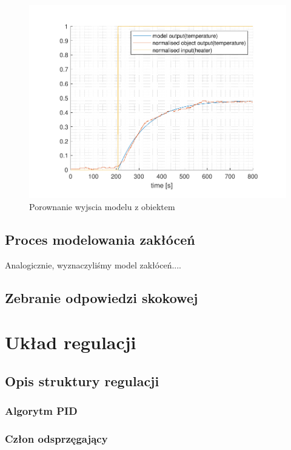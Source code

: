 \documentclass{mwrep}
\begin{document}
\begin{figure}[H]
\centering
\includegraphics[scale=0.8]{materialy/krystian_plots/wykresik_model_obiekt.pdf}
\caption{Porownanie wyjscia modelu z obiektem}
\end{figure}

\section{Proces modelowania zakłóceń}
\label{ModelowanieZaklocen}
Analogicznie, wyznaczyliśmy model zakłóceń....

\section{Zebranie odpowiedzi skokowej}
\label{OdpowiedzSkokowa}

\chapter{Układ regulacji}
\label{UkladRegulacji}

\section{Opis struktury regulacji}
\label{OpisStruktury}

\subsection{Algorytm PID}
\label{PID}

\subsection{Człon odsprzęgający}
\label{Odsprzeganie}
\end{document}
